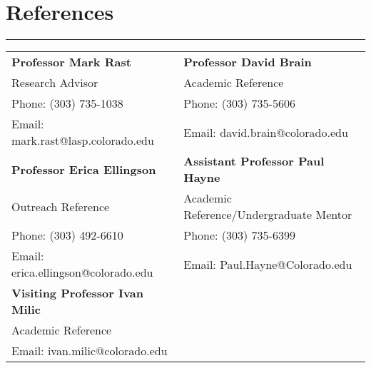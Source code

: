 \documentclass{article}
\newcommand{\divider}{\vskip-2pt\hrule\vskip4pt}
\begin{document}
\section{References}
\divider
\begin{tabularx}{\textwidth}{
    @{\hspace{}}%
    >{\leavevmode\llap{}\raggedright}%
    X%
    @{\quad\hspace{2.5cm}}%
    >{\leavevmode\llap{}\raggedright\arraybackslash}%
    X%
    @{}%
  }
  \textbf{Professor Mark Rast} & \textbf{Professor David Brain} \\
  
Research Advisor & Academic Reference\\ 

Phone: (303) 735-1038 & Phone: (303) 735-5606\\

Email: mark.rast@lasp.colorado.edu & Email: david.brain@colorado.edu\\


  
    \textbf{Professor Erica Ellingson} & \textbf{Assistant Professor Paul Hayne} \\
    Outreach Reference & Academic Reference/Undergraduate Mentor\\ 

Phone: (303) 492-6610 & Phone: (303) 735-6399\\

Email: erica.ellingson@colorado.edu & Email: Paul.Hayne@Colorado.edu\\

      \textbf{Visiting Professor Ivan Milic} & \textbf{} \\
      Academic Reference & \\ 
      
	  Email: ivan.milic@colorado.edu & \\

\end{tabularx}

 
\end{document}

